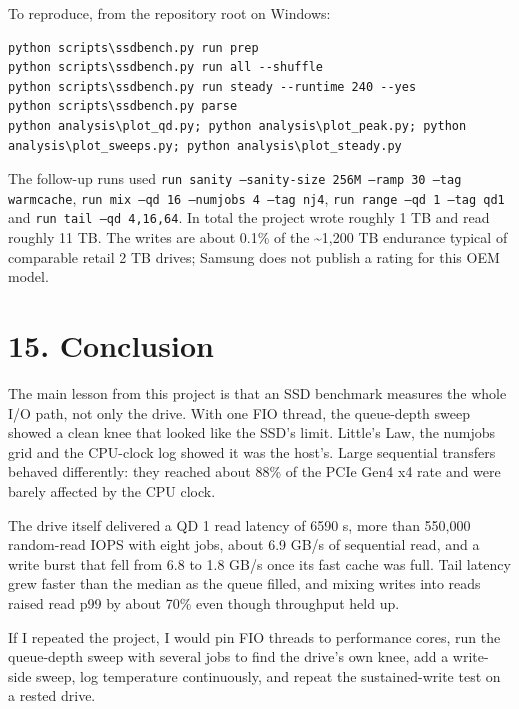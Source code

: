 \documentclass[10pt,letterpaper]{article}
\begin{document}
To reproduce, from the repository root on Windows:


\begin{Verbatim}[fontsize=\scriptsize,breaklines=true]
python scripts\ssdbench.py run prep
python scripts\ssdbench.py run all --shuffle
python scripts\ssdbench.py run steady --runtime 240 --yes
python scripts\ssdbench.py parse
python analysis\plot_qd.py; python analysis\plot_peak.py; python analysis\plot_sweeps.py; python analysis\plot_steady.py
\end{Verbatim}

The follow-up runs used \texttt{run sanity --sanity-size 256M --ramp 30 --tag warmcache}, \texttt{run mix --qd 16 --numjobs 4 --tag nj4}, \texttt{run range --qd 1 --tag qd1} and \texttt{run tail --qd 4,16,64}. In total the project wrote roughly 1 TB and read roughly 11 TB. The writes are about 0.1\% of the \textasciitilde{}1,200 TB endurance typical of comparable retail 2 TB drives; Samsung does not publish a rating for this OEM model.


\section*{15. Conclusion}

The main lesson from this project is that an SSD benchmark measures the whole I/O path, not only the drive. With one FIO thread, the queue-depth sweep showed a clean knee that looked like the SSD's limit. Little's Law, the numjobs grid and the CPU-clock log showed it was the host's. Large sequential transfers behaved differently: they reached about 88\% of the PCIe Gen4 x4 rate and were barely affected by the CPU clock.

The drive itself delivered a QD 1 read latency of 65\textendash{}90 \textmu{}s, more than 550,000 random-read IOPS with eight jobs, about 6.9 GB/s of sequential read, and a write burst that fell from 6.8 to 1.8 GB/s once its fast cache was full. Tail latency grew faster than the median as the queue filled, and mixing writes into reads raised read p99 by about 70\% even though throughput held up.

If I repeated the project, I would pin FIO threads to performance cores, run the queue-depth sweep with several jobs to find the drive's own knee, add a write-side sweep, log temperature continuously, and repeat the sustained-write test on a rested drive.
\end{document}
